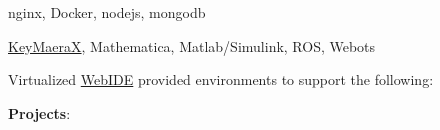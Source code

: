 \documentclass{article}
\newenvironment{achievements}{\begin{list}{$\bullet$}{\topsep 0pt \itemsep -2pt}}{\vspace*{4pt}\end{list}}
\begin{document}
nginx, Docker, nodejs, mongodb

\href{http://www.ls.cs.cmu.edu/KeYmaeraX/}{KeyMaeraX}, Mathematica, Matlab/Simulink, ROS, Webots




  Virtualized \href{https://www.google.com/search?q=webide&oq=webide&aqs=chrome..69i57j0l5.813j0j7&sourceid=chrome&es_sm=122&ie=UTF-8#q=browser+ide}{WebIDE} provided environments to support the following:

\vspace{2mm}
\textbf{Projects}:
\vspace{2mm}
        
\end{document}
